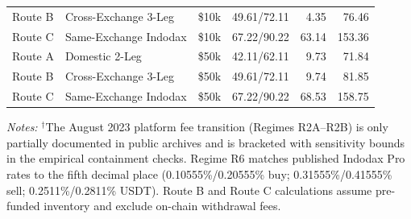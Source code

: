 \begin{table}[htbp]
\begin{tabular}{@{}l>{\raggedright\arraybackslash}p{2.3cm}rrrrrr@{}}
Route B & Cross-Exchange 3-Leg & \$10k & \multicolumn{2}{r}{49.61/72.11} & \multicolumn{2}{r}{4.35} & 76.46 \\
Route C & Same-Exchange Indodax & \$10k & \multicolumn{2}{r}{67.22/90.22} & \multicolumn{2}{r}{63.14} & 153.36 \\
Route A & Domestic 2-Leg & \$50k & \multicolumn{2}{r}{42.11/62.11} & \multicolumn{2}{r}{9.73} & 71.84 \\
Route B & Cross-Exchange 3-Leg & \$50k & \multicolumn{2}{r}{49.61/72.11} & \multicolumn{2}{r}{9.74} & 81.85 \\
Route C & Same-Exchange Indodax & \$50k & \multicolumn{2}{r}{67.22/90.22} & \multicolumn{2}{r}{68.53} & 158.75 \\
\bottomrule
\end{tabular}\endgroup
\begin{minipage}{\textwidth}\footnotesize\vspace{3pt}
\emph{Notes:} $^\dagger$The August 2023 platform fee transition (Regimes R2A--R2B) is only partially documented in public archives and is bracketed with sensitivity bounds in the empirical containment checks. Regime R6 matches published Indodax Pro rates to the fifth decimal place (0.10555\%/0.20555\% buy; 0.31555\%/0.41555\% sell; 0.2511\%/0.2811\% USDT). Route B and Route C calculations assume pre-funded inventory and exclude on-chain withdrawal fees.
\end{minipage}
\end{table}

